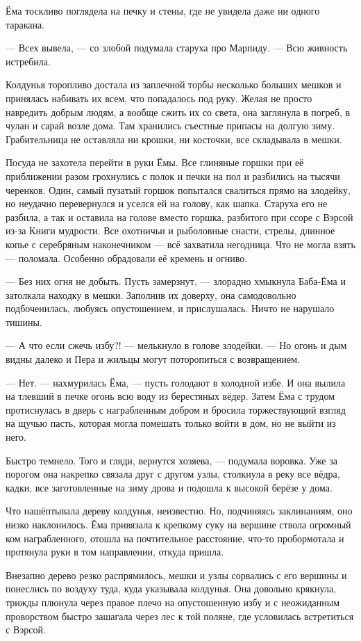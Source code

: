 \documentclass[oneside,final,14pt]{extreport}
\begin{document}
	Ёма тоскливо поглядела на печку и стены, где не увидела даже ни одного таракана.
	
	— Всех вывела, — со злобой подумала старуха про Марпиду. — Всю живность истребила.
	
	Колдунья торопливо достала из заплечной торбы несколько больших мешков и принялась набивать их всем, что попадалось под руку. Желая не просто навредить добрым людям, а вообще сжить их со света, она заглянула в погреб, в чулан и сарай возле дома. Там хранились съестные припасы на долгую зиму. Грабительница не оставляла ни крошки, ни косточки, все складывала в мешки.
	
	Посуда не захотела перейти в руки Ёмы. Все глиняные горшки при её приближении разом грохнулись с полок и печки на пол и разбились на тысячи черенков. Один, самый пузатый горшок попытался свалиться прямо на злодейку, но неудачно перевернулся и уселся ей на голову, как шапка. Старуха его не разбила, а так и оставила на голове вместо горшка, разбитого при ссоре с Вэрсой из-за Книги мудрости. Все охотничьи и рыболовные снасти, стрелы, длинное копье с серебряным наконечником — всё захватила негодница. Что не могла взять — поломала. Особенно обрадовали её кремень и огниво.
	
	— Без них огня не добыть. Пусть замерзнут, — злорадно хмыкнула Баба-Ёма и затолкала находку в мешки. Заполнив их доверху, она самодовольно подбоченилась, любуясь опустошением, и прислушалась. Ничто не нарушало тишины.
	
	— А что если сжечь избу?! — мелькнуло в голове злодейки. — Но огонь и дым видны далеко и Пера и жильцы могут поторопиться с возвращением.
	
	— Нет. — нахмурилась Ёма, — пусть голодают в холодной избе. И она вылила на тлевший в печке огонь всю воду из берестяных вёдер. Затем Ёма с трудом протиснулась в дверь с награбленным добром и бросила торжествующий взгляд на щучью пасть, которая могла помешать только войти в дом, но не выйти из него.
	
	Быстро темнело. Того и гляди, вернутся хозяева, — подумала воровка. Уже за порогом она накрепко связала друг с другом узлы, столкнула в реку все вёдра, кадки, все заготовленные на зиму дрова и подошла к высокой берёзе у дома.
	
	Что нашёптывала дереву колдунья, неизвестно. Но, подчиняясь заклинаниям, оно низко наклонилось. Ёма привязала к крепкому суку на вершине ствола огромный ком награбленного, отошла на почтительное расстояние, что-то пробормотала и протянула руки в том направлении, откуда пришла.
	
	Внезапно дерево резко распрямилось, мешки и узлы сорвались с его вершины и понеслись по воздуху туда, куда указывала колдунья. Она довольно крякнула, трижды плюнула через правое плечо на опустошенную избу и с неожиданным проворством быстро зашагала через лес к той поляне, где условилась встретиться с Вэрсой.
	
\end{document}
